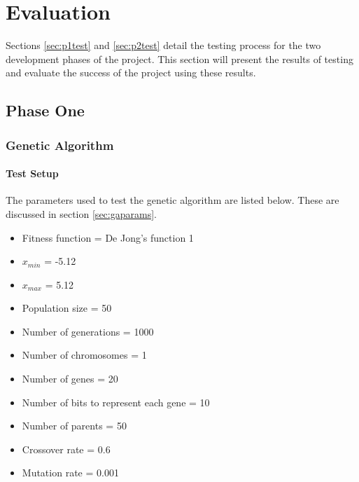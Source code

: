 \chapter{Evaluation}
\label{sec:eval}

Sections \ref{sec:p1test} and \ref{sec:p2test} detail the testing process for the two development phases of the project. This section will present the results of testing and evaluate the success of the project using these results.

\section{Phase One}

\subsection{Genetic Algorithm}

\subsubsection{Test Setup}
The parameters used to test the genetic algorithm are listed below. These are discussed in section \ref{sec:gaparams}.
\begin{itemize}
  \item{Fitness function = De Jong's function 1}
  \item{$x_{min}$ = -5.12}
  \item{$x_{max}$ = 5.12}
  \item{Population size = 50}
  \item{Number of generations = 1000}
  \item{Number of chromosomes = 1}
  \item{Number of genes = 20}
  \item{Number of bits to represent each gene = 10}
  \item{Number of parents = 50}
  \item{Crossover rate = 0.6}
  \item{Mutation rate = 0.001}
\end{itemize}

